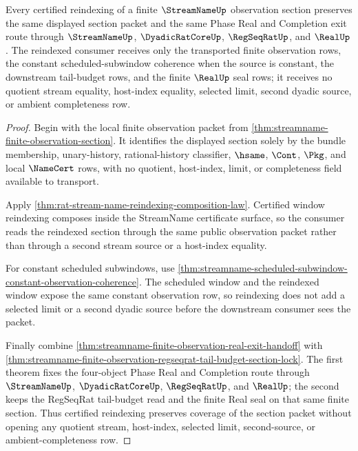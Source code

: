 \begin{theorem}
\label{thm:streamname-finite-observation-section-reindex-coverage}
Every certified reindexing of a finite $\StreamNameUp$ observation section
preserves the same displayed section packet and the same Phase Real and
Completion exit route through $\StreamNameUp$, $\DyadicRatCoreUp$,
$\RegSeqRatUp$, and $\RealUp$. The reindexed consumer receives only the
transported finite observation rows, the constant scheduled-subwindow
coherence when the source is constant, the downstream tail-budget rows, and
the finite $\RealUp$ seal rows; it receives no quotient stream equality,
host-index equality, selected limit, second dyadic source, or ambient
completeness row.
\end{theorem}
\begin{proof}
Begin with the local finite observation packet from
\autoref{thm:streamname-finite-observation-section}. It identifies the
displayed section solely by the bundle membership, unary-history,
rational-history classifier, $\hsame$, $\Cont$, $\Pkg$, and local
$\NameCert$ rows, with no quotient, host-index, limit, or completeness field
available to transport.

Apply \autoref{thm:rat-stream-name-reindexing-composition-law}. Certified
window reindexing composes inside the StreamName certificate surface, so the
consumer reads the reindexed section through the same public observation
packet rather than through a second stream source or a host-index equality.

For constant scheduled subwindows, use
\autoref{thm:streamname-scheduled-subwindow-constant-observation-coherence}.
The scheduled window and the reindexed window expose the same constant
observation row, so reindexing does not add a selected limit or a second
dyadic source before the downstream consumer sees the packet.

Finally combine
\autoref{thm:streamname-finite-observation-real-exit-handoff} with
\autoref{thm:streamname-finite-observation-regseqrat-tail-budget-section-lock}.
The first theorem fixes the four-object Phase Real and Completion route
through $\StreamNameUp$, $\DyadicRatCoreUp$, $\RegSeqRatUp$, and $\RealUp$;
the second keeps the RegSeqRat tail-budget read and the finite Real seal on
that same finite section. Thus certified reindexing preserves coverage of the
section packet without opening any quotient stream, host-index, selected
limit, second-source, or ambient-completeness row.
\end{proof}

